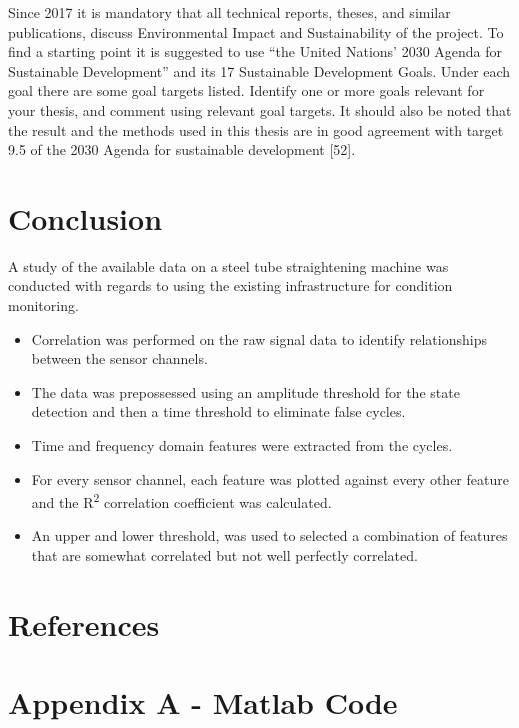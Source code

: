 \documentclass[]{article}
\begin{document}
Since 2017 it is mandatory that all technical reports, theses, and similar publications, discuss Environmental Impact and Sustainability of the project. To find a starting point it is suggested to use “the United Nations’ 2030 Agenda for Sustainable Development” and its 17 Sustainable Development Goals. Under each goal there are some goal targets listed. Identify one or more goals relevant for your thesis, and comment using relevant goal targets.
It should also be noted that the result and the methods used in this thesis are in good agreement with target 9.5 of the 2030 Agenda for sustainable development [52].
\clearpage

\section{Conclusion}
A study of the available data on a steel tube straightening machine was conducted with regards to using the existing infrastructure for condition monitoring.
\begin{itemize}
\item Correlation was performed on the raw signal data to identify relationships between the sensor channels.
\item The data was prepossessed using an amplitude threshold for the state detection and then a time threshold to eliminate false cycles.
\item Time and frequency domain features were extracted from the cycles.
\item For every sensor channel, each feature was plotted against every other feature and the R\textsuperscript{2} correlation coefficient was calculated.
\item An upper and lower threshold, was used to selected a combination of features that are somewhat correlated but not well perfectly correlated.
\end{itemize}
\newpage

\section{References} 
\printbibliography[heading=none] 
\clearpage  
\section{Appendix A - Matlab Code}
\UseRawInputEncoding


%
\end{document}
